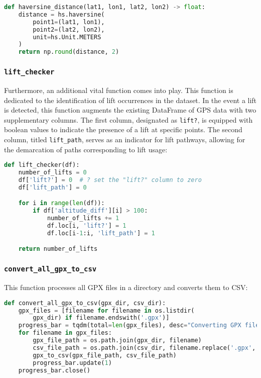 \begin{lstlisting}[language=Python]
def haversine_distance(lat1, lon1, lat2, lon2) -> float:
    distance = hs.haversine(
        point1=(lat1, lon1),
        point2=(lat2, lon2),
        unit=hs.Unit.METERS
    )
    return np.round(distance, 2)
\end{lstlisting}

\subsubsection{\texttt{lift\_checker}}

Furthermore, an additional vital function comes into play. This function is dedicated to the identification of 
lift occurrences in the dataset. In the event a lift is detected, this function augments the existing DataFrame of 
GPS data with two supplementary columns. The first column, designated as \texttt{lift?}, 
is equipped with boolean values to indicate the presence of a lift at specific points. 
The second column, titled \texttt{lift\_path}, serves as an indicator for lift pathways, 
allowing for the demarcation of paths corresponding to lift usage:

\begin{lstlisting}[language=Python]
def lift_checker(df):
    number_of_lifts = 0
    df['lift?'] = 0  # ? set the "lift?" column to zero
    df['lift_path'] = 0

    for i in range(len(df)):
        if df['altitude_diff'][i] > 100:
            number_of_lifts += 1
            df.loc[i, 'lift?'] = 1
            df.loc[i-1:i, 'lift_path'] = 1

    return number_of_lifts

\end{lstlisting}

\subsubsection{\texttt{convert\_all\_gpx\_to\_csv}}

This function processes all GPX files in a directory and converts them to CSV:

\begin{lstlisting}[language=Python]
def convert_all_gpx_to_csv(gpx_dir, csv_dir):
    gpx_files = [filename for filename in os.listdir(
        gpx_dir) if filename.endswith('.gpx')]
    progress_bar = tqdm(total=len(gpx_files), desc="Converting GPX files")
    for filename in gpx_files:
        gpx_file_path = os.path.join(gpx_dir, filename)
        csv_file_path = os.path.join(csv_dir, filename.replace('.gpx', '.csv'))
        gpx_to_csv(gpx_file_path, csv_file_path)
        progress_bar.update(1)
    progress_bar.close()
\end{lstlisting}

